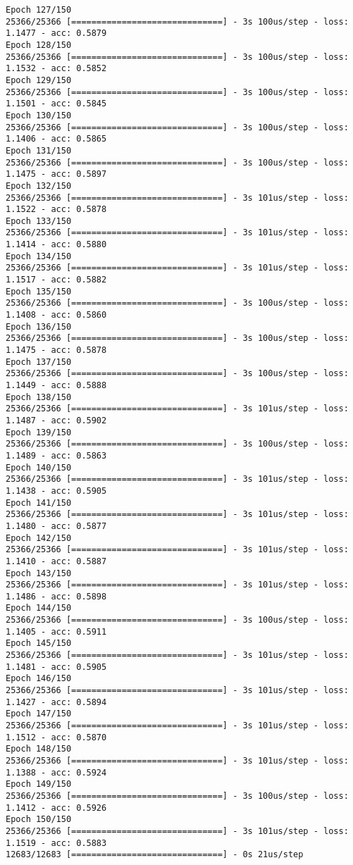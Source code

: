 \documentclass[11pt]{article}
\begin{document}
\begin{Verbatim}[commandchars=\\\{\}]
Epoch 127/150
25366/25366 [==============================] - 3s 100us/step - loss: 1.1477 - acc: 0.5879
Epoch 128/150
25366/25366 [==============================] - 3s 100us/step - loss: 1.1532 - acc: 0.5852
Epoch 129/150
25366/25366 [==============================] - 3s 100us/step - loss: 1.1501 - acc: 0.5845
Epoch 130/150
25366/25366 [==============================] - 3s 100us/step - loss: 1.1406 - acc: 0.5865
Epoch 131/150
25366/25366 [==============================] - 3s 100us/step - loss: 1.1475 - acc: 0.5897
Epoch 132/150
25366/25366 [==============================] - 3s 101us/step - loss: 1.1522 - acc: 0.5878
Epoch 133/150
25366/25366 [==============================] - 3s 101us/step - loss: 1.1414 - acc: 0.5880
Epoch 134/150
25366/25366 [==============================] - 3s 101us/step - loss: 1.1517 - acc: 0.5882
Epoch 135/150
25366/25366 [==============================] - 3s 100us/step - loss: 1.1408 - acc: 0.5860
Epoch 136/150
25366/25366 [==============================] - 3s 100us/step - loss: 1.1475 - acc: 0.5878
Epoch 137/150
25366/25366 [==============================] - 3s 100us/step - loss: 1.1449 - acc: 0.5888
Epoch 138/150
25366/25366 [==============================] - 3s 101us/step - loss: 1.1487 - acc: 0.5902
Epoch 139/150
25366/25366 [==============================] - 3s 100us/step - loss: 1.1489 - acc: 0.5863
Epoch 140/150
25366/25366 [==============================] - 3s 101us/step - loss: 1.1438 - acc: 0.5905
Epoch 141/150
25366/25366 [==============================] - 3s 101us/step - loss: 1.1480 - acc: 0.5877
Epoch 142/150
25366/25366 [==============================] - 3s 101us/step - loss: 1.1410 - acc: 0.5887
Epoch 143/150
25366/25366 [==============================] - 3s 101us/step - loss: 1.1486 - acc: 0.5898
Epoch 144/150
25366/25366 [==============================] - 3s 100us/step - loss: 1.1405 - acc: 0.5911
Epoch 145/150
25366/25366 [==============================] - 3s 101us/step - loss: 1.1481 - acc: 0.5905
Epoch 146/150
25366/25366 [==============================] - 3s 101us/step - loss: 1.1427 - acc: 0.5894
Epoch 147/150
25366/25366 [==============================] - 3s 101us/step - loss: 1.1512 - acc: 0.5870
Epoch 148/150
25366/25366 [==============================] - 3s 101us/step - loss: 1.1388 - acc: 0.5924
Epoch 149/150
25366/25366 [==============================] - 3s 100us/step - loss: 1.1412 - acc: 0.5926
Epoch 150/150
25366/25366 [==============================] - 3s 101us/step - loss: 1.1519 - acc: 0.5883
12683/12683 [==============================] - 0s 21us/step

    \end{Verbatim}
\end{document}
